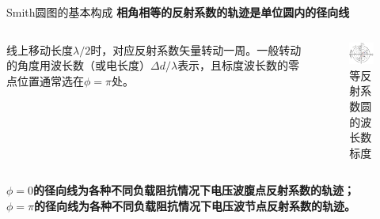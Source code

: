 \begin{frame}{Smith圆图的基本构成}
  \textbf{相角相等的反射系数的轨迹是单位圆内的径向线}
  \begin{columns}
    \begin{column}{0.4\linewidth}
      线上移动长度$\lambda/2$时，对应反射系数矢量转动一周。一般转动的角度用波长数（或电长度）$\Delta d/\lambda$表示，且标度波长数的零点位置通常选在$\phi=\pi$处。
    \end{column}
    \begin{column}{0.6\linewidth}
      \begin{figure}
        \includegraphics[width=5cm]{Cha4//reflect_coeff.png}
        \caption{等反射系数圆的波长数标度}
      \end{figure}
    \end{column}
  \end{columns}
  $\phi=0$\textbf{的径向线为各种不同负载阻抗情况下电压波腹点反射系数的轨迹；}\\
  $\phi=\pi$\textbf{的径向线为各种不同负载阻抗情况下电压波节点反射系数的轨迹。}
\end{frame}

